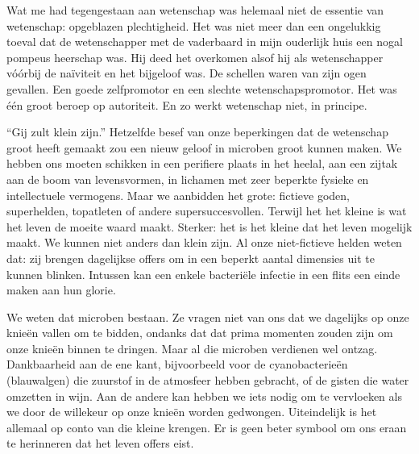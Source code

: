 \documentclass[12pt,a4paper]{article}
\begin{document}
Wat me had tegengestaan aan wetenschap was helemaal niet de essentie van wetenschap: opgeblazen plechtigheid. Het was niet meer dan een ongelukkig toeval dat de wetenschapper met de vaderbaard in mijn ouderlijk huis een nogal pompeus heerschap was. Hij deed het overkomen alsof hij als wetenschapper vóórbij de naïviteit en het bijgeloof was. De schellen waren van zijn ogen gevallen. Een goede zelfpromotor en een slechte wetenschapspromotor. Het was één groot beroep op autoriteit. En zo werkt wetenschap niet, in principe.

“Gij zult klein zijn.” Hetzelfde besef van onze beperkingen dat de wetenschap groot heeft gemaakt zou een nieuw geloof in microben groot kunnen maken. We hebben ons moeten schikken in een perifiere plaats in het heelal, aan een zijtak aan de boom van levensvormen, in lichamen met zeer beperkte fysieke en intellectuele vermogens. Maar we aanbidden het grote: fictieve goden, superhelden, topatleten of andere supersuccesvollen. Terwijl het het kleine is wat het leven de moeite waard maakt. Sterker: het is het kleine dat het leven mogelijk maakt. We kunnen niet anders dan klein zijn. Al onze niet-fictieve helden weten dat: zij brengen dagelijkse offers om in een beperkt aantal dimensies uit te kunnen blinken. Intussen kan een enkele bacteriële infectie in een flits een einde maken aan hun glorie.

We weten dat microben bestaan. Ze vragen niet van ons dat we dagelijks op onze knieën vallen om te bidden, ondanks dat dat prima momenten zouden zijn om onze knieën binnen te dringen. Maar al die microben verdienen wel ontzag. Dankbaarheid aan de ene kant, bijvoorbeeld voor de cyanobacterieën (blauwalgen) die zuurstof in de atmosfeer hebben gebracht, of de gisten die water omzetten in wijn. Aan de andere kan hebben we iets nodig om te vervloeken als we door de willekeur op onze knieën worden gedwongen. Uiteindelijk is het allemaal op conto van die kleine krengen. Er is geen beter symbool om ons eraan te herinneren dat het leven offers eist.
\end{document}
